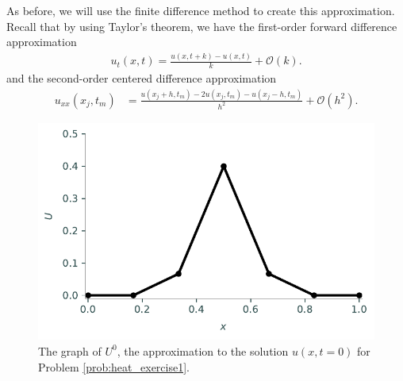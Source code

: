 As before, we will use the finite difference method to create this approximation.
Recall that by using Taylor's theorem, we have the first-order forward difference approximation
\begin{align*}
	u_t(x,t) = \frac{u(x,t+k) - u(x,t)}{k} + \mathcal{O}(k).
\end{align*}
and the second-order centered difference approximation
\begin{align*}
	u_{xx}(x_j,t_m) &= \frac{u(x_j + h,t_m )-2 u(x_j,t_m)- u(x_j - h,t_m)}{h^2} + \mathcal{O}(h^2).
\end{align*}

\begin{figure}
\centering
\includegraphics[width=\textwidth]{figures/heatexercise1a.pdf}
\caption{The graph of $U^{0}$, the approximation to the solution $u(x,t=0)$ for Problem \ref{prob:heat_exercise1}.}
\label{fig:heatexercise1a}
\end{figure}

